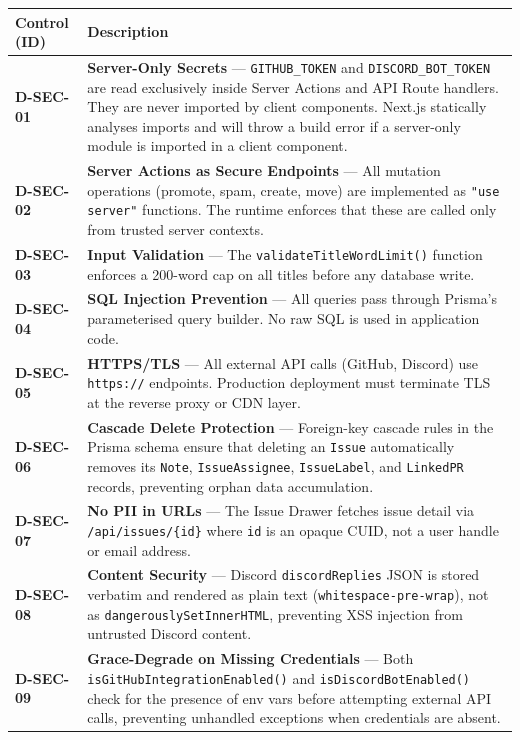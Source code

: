 \documentclass[12pt,a4paper]{report}
\begin{document}
\begin{longtable}{>{\bfseries}p{2.8cm} p{10cm}}
\toprule
Control (ID) & Description \\
\midrule
\endhead
D-SEC-01 & \textbf{Server-Only Secrets} --- \texttt{GITHUB\_TOKEN} and
  \texttt{DISCORD\_BOT\_TOKEN} are read exclusively inside Server Actions and
  API Route handlers.  They are never imported by client components.  Next.js
  statically analyses imports and will throw a build error if a server-only
  module is imported in a client component. \\
D-SEC-02 & \textbf{Server Actions as Secure Endpoints} --- All mutation
  operations (promote, spam, create, move) are implemented as \texttt{"use server"} functions.  The runtime enforces that these are called only from trusted
  server contexts. \\
D-SEC-03 & \textbf{Input Validation} --- The \texttt{validateTitleWordLimit()}
  function enforces a 200-word cap on all titles before any database write. \\
D-SEC-04 & \textbf{SQL Injection Prevention} --- All queries pass through
  Prisma's parameterised query builder.  No raw SQL is used in application code. \\
D-SEC-05 & \textbf{HTTPS/TLS} --- All external API calls (GitHub, Discord) use
  \texttt{https://} endpoints.  Production deployment must terminate TLS at the
  reverse proxy or CDN layer. \\
D-SEC-06 & \textbf{Cascade Delete Protection} --- Foreign-key cascade rules in
  the Prisma schema ensure that deleting an \texttt{Issue} automatically
  removes its \texttt{Note}, \texttt{IssueAssignee}, \texttt{IssueLabel}, and
  \texttt{LinkedPR} records, preventing orphan data accumulation. \\
D-SEC-07 & \textbf{No PII in URLs} --- The Issue Drawer fetches issue detail
  via \texttt{/api/issues/\{id\}} where \texttt{id} is an opaque CUID, not a
  user handle or email address. \\
D-SEC-08 & \textbf{Content Security} --- Discord \texttt{discordReplies} JSON
  is stored verbatim and rendered as plain text (\texttt{whitespace-pre-wrap}),
  not as \texttt{dangerouslySetInnerHTML}, preventing XSS injection from
  untrusted Discord content. \\
D-SEC-09 & \textbf{Grace-Degrade on Missing Credentials} --- Both
  \texttt{isGitHubIntegrationEnabled()} and \texttt{isDiscordBotEnabled()}
  check for the presence of env vars before attempting external API calls,
  preventing unhandled exceptions when credentials are absent. \\
\bottomrule
\end{longtable}
\end{document}
